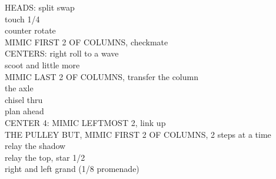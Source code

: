 \documentclass[12pt]{article}
\begin{document}
HEADS: split swap \\
touch 1/4 \\
counter rotate \\
MIMIC FIRST 2 OF COLUMNS, checkmate \\
CENTERS: right roll to a wave \\
scoot and little more \\
MIMIC LAST 2 OF COLUMNS, transfer the column \\
the axle \\
chisel thru \\
plan ahead \\
CENTER 4: MIMIC LEFTMOST 2, link up \\
THE PULLEY BUT, MIMIC FIRST 2 OF COLUMNS, 2 steps at a time \\
relay the shadow \\
relay the top, star 1/2 \\
right and left grand  (1/8 promenade)
\endsequence
\end{document}
